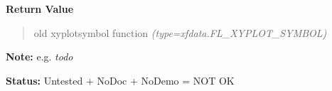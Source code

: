 \begin{boxedminipage}{\funcwidth}
\begin{quote}
      \end{quote}

      \textbf{Return Value}
    \vspace{-1ex}

      \begin{quote}

old xyplotsymbol function
      {\it (type=xfdata.FL\_XYPLOT\_SYMBOL)}

      \end{quote}

\textbf{Note:} 
e.g. \emph{todo}


\textbf{Status:} 
Untested + NoDoc + NoDemo = NOT OK


    \end{boxedminipage}

    \label{xformslib:flxyplot:fl_set_xyplot_mark_active}

    \vspace{0.5ex}

